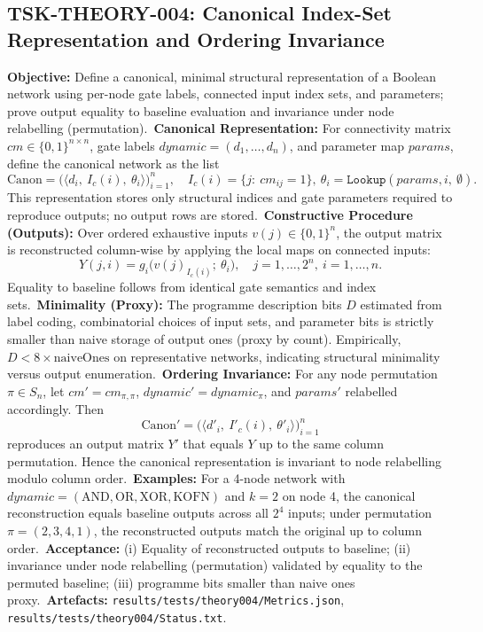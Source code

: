 \documentclass[11pt]{article}
\begin{document}
\subsection{TSK-THEORY-004: Canonical Index-Set Representation and Ordering Invariance}
\textbf{Objective:} Define a canonical, minimal structural representation of a Boolean network using per-node gate labels, connected input index sets, and parameters; prove output equality to baseline evaluation and invariance under node relabelling (permutation).\
\textbf{Canonical Representation:} For connectivity matrix \(cm\in\{0,1\}^{n\times n}\), gate labels \(dynamic=(d_1,\dots,d_n)\), and parameter map \(params\), define the canonical network as the list
\[
\mathrm{Canon} = \big( \langle d_i,\ I_c(i),\ \theta_i \rangle \big)_{i=1}^{n},\quad I_c(i)=\{j:\ cm_{ij}=1\},\ \theta_i=\texttt{Lookup}(params,i,\ \emptyset).
\]
This representation stores only structural indices and gate parameters required to reproduce outputs; no output rows are stored.\
\textbf{Constructive Procedure (Outputs):} Over ordered exhaustive inputs \(v(j)\in\{0,1\}^n\), the output matrix is reconstructed column-wise by applying the local maps on connected inputs:
\[
Y(j,i) = g_i\big( v(j)_{I_c(i)};\ \theta_i \big),\quad j=1,\dots,2^n,\ i=1,\dots,n.
\]
Equality to baseline follows from identical gate semantics and index sets.\
\textbf{Minimality (Proxy):} The programme description bits \(D\) estimated from label coding, combinatorial choices of input sets, and parameter bits is strictly smaller than naive storage of output ones (proxy by count). Empirically, \(D<8\times \text{naiveOnes}\) on representative networks, indicating structural minimality versus output enumeration.\
\textbf{Ordering Invariance:} For any node permutation \(\pi\in S_n\), let \(cm' = cm_{\pi,\pi}\), \(dynamic' = dynamic_{\pi}\), and \(params'\) relabelled accordingly. Then
\[
\mathrm{Canon}' = \big( \langle d'_{i},\ I'_c(i),\ \theta'_{i} \rangle \big)_{i=1}^{n}
\]
reproduces an output matrix \(Y'\) that equals \(Y\) up to the same column permutation. Hence the canonical representation is invariant to node relabelling modulo column order.\
\textbf{Examples:} For a 4-node network with \(dynamic=(\mathrm{AND},\mathrm{OR},\mathrm{XOR},\mathrm{KOFN})\) and \(k=2\) on node 4, the canonical reconstruction equals baseline outputs across all \(2^4\) inputs; under permutation \(\pi=(2,3,4,1)\), the reconstructed outputs match the original up to column order.\
\textbf{Acceptance:} (i) Equality of reconstructed outputs to baseline; (ii) invariance under node relabelling (permutation) validated by equality to the permuted baseline; (iii) programme bits smaller than naive ones proxy.\
\textbf{Artefacts:} \texttt{results/tests/theory004/Metrics.json}, \texttt{results/tests/theory004/Status.txt}.\
\end{document}
